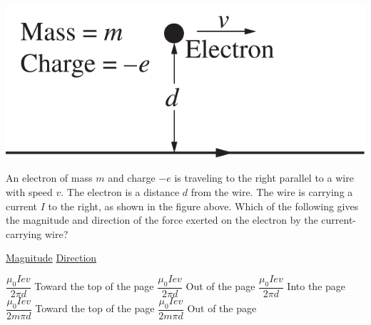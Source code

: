 
\begin{center}
    \includegraphics[scale=0.3]{images/img-014-027.png}
\end{center}

\begin{questions}
\setcounter{question}{30}

\question
An electron of mass $m$ and charge $-e$ is traveling to the right parallel to a wire with speed $v$. The electron is a distance $d$ from the wire. The wire is carrying a current $I$ to the right, as shown in the figure above. Which of the following gives the magnitude and direction of the force exerted on the electron by the current-carrying wire?

\tabto{0.75cm} \underline{Magnitude}
\tabto{4.00cm} \underline{Direction}

\begin{choices}
    \choice $\dfrac{\mu_{0} I e v}{2 \pi d}$   \tabto{3.25cm} Toward the top of the page
    \choice $\dfrac{\mu_{0} I e v}{2 \pi d}$   \tabto{3.25cm} Out of the page
    \choice $\dfrac{\mu_{0} I e v}{2 \pi d}$   \tabto{3.25cm} Into the page
    \choice $\dfrac{\mu_{0} I e v}{2 m \pi d}$ \tabto{3.25cm} Toward the top of the page 
    \choice $\dfrac{\mu_{0} I e v}{2 m \pi d}$ \tabto{3.25cm} Out of the page
\end{choices}

\end{questions}
